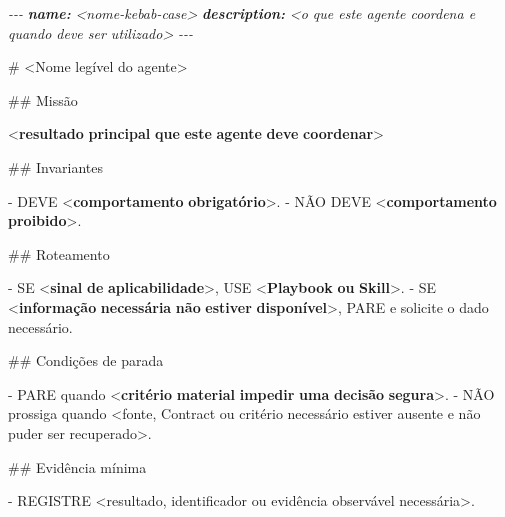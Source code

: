 \documentclass[
  10pt,
  a4paper,
  oneside]{book}
\newenvironment{Shaded}{}{}
\newcommand{\AnnotationTok}[1]{\textcolor[rgb]{0.38,0.63,0.69}{\textbf{\textit{#1}}}}
\newcommand{\CommentTok}[1]{\textcolor[rgb]{0.38,0.63,0.69}{\textit{#1}}}
\newcommand{\DataTypeTok}[1]{\textcolor[rgb]{0.56,0.13,0.00}{#1}}
\newcommand{\ErrorTok}[1]{\textcolor[rgb]{1.00,0.00,0.00}{\textbf{#1}}}
\newcommand{\FunctionTok}[1]{\textcolor[rgb]{0.02,0.16,0.49}{#1}}
\newcommand{\KeywordTok}[1]{\textcolor[rgb]{0.00,0.44,0.13}{\textbf{#1}}}
\newcommand{\NormalTok}[1]{#1}
\newcommand{\SpecialStringTok}[1]{\textcolor[rgb]{0.73,0.40,0.53}{#1}}
\renewenvironment{Shaded}{\begin{snugshade}}{\end{snugshade}}%
\begin{document}
\begin{Shaded}
\begin{Highlighting}[]
\CommentTok{{-}{-}{-}}
\AnnotationTok{name:}\CommentTok{ \textless{}nome{-}kebab{-}case\textgreater{}}
\AnnotationTok{description:}\CommentTok{ \textless{}o que este agente coordena e quando deve ser utilizado\textgreater{}}
\CommentTok{{-}{-}{-}}

\FunctionTok{\# \textless{}Nome legível do agente\textgreater{}}

\FunctionTok{\#\# Missão}

\DataTypeTok{\textless{}}\KeywordTok{resultado} \ErrorTok{principal} \ErrorTok{que} \ErrorTok{este} \ErrorTok{agente} \ErrorTok{deve} \ErrorTok{coordenar}\DataTypeTok{\textgreater{}}

\FunctionTok{\#\# Invariantes}

\SpecialStringTok{{-} }\NormalTok{DEVE }\DataTypeTok{\textless{}}\KeywordTok{comportamento} \ErrorTok{obrigatório}\DataTypeTok{\textgreater{}}\NormalTok{.}
\SpecialStringTok{{-} }\NormalTok{NÃO DEVE }\DataTypeTok{\textless{}}\KeywordTok{comportamento} \ErrorTok{proibido}\DataTypeTok{\textgreater{}}\NormalTok{.}

\FunctionTok{\#\# Roteamento}

\SpecialStringTok{{-} }\NormalTok{SE }\DataTypeTok{\textless{}}\KeywordTok{sinal} \ErrorTok{de} \ErrorTok{aplicabilidade}\DataTypeTok{\textgreater{}}\NormalTok{, USE }\DataTypeTok{\textless{}}\KeywordTok{Playbook} \ErrorTok{ou} \ErrorTok{Skill}\DataTypeTok{\textgreater{}}\NormalTok{.}
\SpecialStringTok{{-} }\NormalTok{SE }\DataTypeTok{\textless{}}\KeywordTok{informação} \ErrorTok{necessária} \ErrorTok{não} \ErrorTok{estiver} \ErrorTok{disponível}\DataTypeTok{\textgreater{}}\NormalTok{, PARE e solicite o dado necessário.}

\FunctionTok{\#\# Condições de parada}

\SpecialStringTok{{-} }\NormalTok{PARE quando }\DataTypeTok{\textless{}}\KeywordTok{critério} \ErrorTok{material} \ErrorTok{impedir} \ErrorTok{uma} \ErrorTok{decisão} \ErrorTok{segura}\DataTypeTok{\textgreater{}}\NormalTok{.}
\SpecialStringTok{{-} }\NormalTok{NÃO prossiga quando \textless{}fonte, Contract ou critério necessário estiver ausente e não puder ser recuperado\textgreater{}.}

\FunctionTok{\#\# Evidência mínima}

\SpecialStringTok{{-} }\NormalTok{REGISTRE \textless{}resultado, identificador ou evidência observável necessária\textgreater{}.}
\end{Highlighting}
\end{Shaded}
\end{document}
